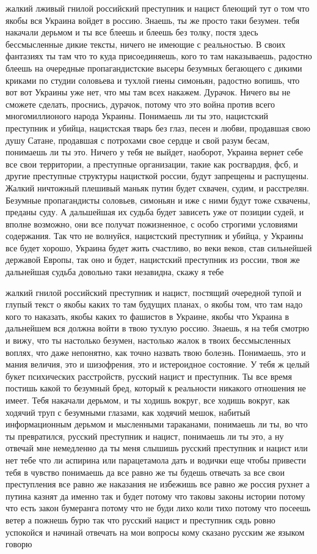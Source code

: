жалкий лживый гнилой российский преступник и нацист блеющий тут о том что якобы
вся Украина войдет в россию. Знаешь, ты же просто таки безумен. тебя накачали
дерьмом и ты все блеешь и блеешь без толку, постя здесь бессмысленные дикие
тексты, ничего не имеющие с реальностью.  В своих фантазиях ты там что то куда
присоединяешь, кого то там наказываешь, радостно блеешь на очередные
пропагандистские высеры безумных бегающего с дикими криками по студии соловьева
и тухлой гиены симоньян, радостно вопишь, что вот вот Украины уже нет, что мы
там всех накажем.  Дурачок. Ничего вы не сможете сделать, проснись, дурачок,
потому что это война против всего многомиллионого народа Украины. Понимаешь ли
ты это, нацистский преступник и убийца, нацистская тварь без глаз, песен и
любви, продавшая свою душу Сатане, продавшая с потрохами свое сердце и свой
разум бесам, понимаешь ли ты это.  Ничего у тебя не выйдет, наоборот, Украина
вернет себе все свои территории, а преступные организации, такие как
росгвардия, фсб, и другие преступные структуры нацисткой россии, будут
запрещены и распущены. Жалкий ничтожный плешивый маньяк путин будет схвачен,
судим, и расстрелян. Безумные пропагандисты соловьев, симоньян и иже с ними
будут тоже схвачены, преданы суду. А дальшейшая их судьба будет зависеть уже от
позиции судей, и вполне возможно, они все получат пожизненное, с особо строгими
условиями содержания. Так что не волнуйся, нацистский преступник и убийца, у
Украины все будет хорошо, Украина будет жить счастливо, во веки веков, став
сильнейшей державой Европы, так оно и будет, нацистский преступник из россии,
твоя же дальнейшая судьба довольно таки незавидна, скажу я тебе

жалкий гнилой российский преступник и нацист, постящий очередной тупой и глупый
текст о якобы каких то там будущих планах, о якобы том, что там надо кого то
наказать, якобы каких то фашистов в Украине, якобы что Украина в дальнейшем вся
должна войти в твою тухлую россию.  Знаешь, я на тебя смотрю и вижу, что ты
настолько безумен, настолько жалок в твоих бессмысленных воплях, что даже
непонятно, как точно назвать твою болезнь. Понимаешь, это и мания величия, это
и шизофрения, это и истероидное состояние. У тебя ж целый букет психических
расстройств, русский нацист и преступник. Ты все время постишь какой то
безумный бред, который к реальности никакого отношения не имеет. Тебя накачали
дерьмом, и ты ходишь вокруг, все ходишь вокруг, как ходячий труп с безумными
глазами, как ходячий мешок, набитый информационным дерьмом и мысленными
тараканами, понимаешь ли ты, во что ты превратился, русский преступник и
нацист, понимаешь ли ты это, а ну отвечай мне немедленно да ты меня слышишь
русский преступник и нацист или нет тебе что ли аспирина или парацетамола дать
и водички еще чтобы привести тебя в чувство понимаешь да все равно же ты будешь
отвечать за все свои преступления все равно же наказания не избежишь все равно
же россия рухнет а путина казнят да именно так и будет потому что таковы законы
истории потому что есть закон бумеранга потому что не буди лихо коли тихо
потому что посеешь ветер а пожнешь бурю так что русский нацист и преступник
сядь ровно успокойся и начинай отвечать на мои вопросы кому сказано русским же
языком говорю

